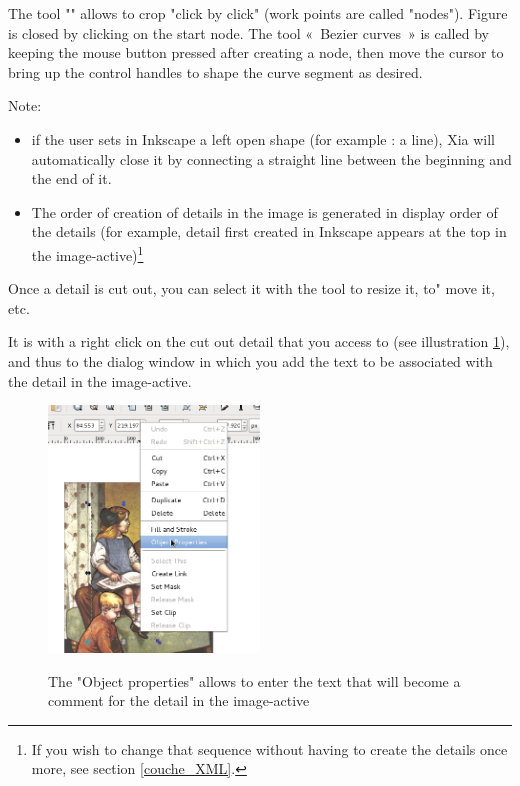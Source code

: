 The tool "" 
allows to crop "click by click" (work points are called 
"nodes").  Figure is closed by clicking on the start node. 
The tool «~Bezier curves~» is called by keeping the mouse button pressed 
after creating a node, then move the cursor to bring up the control handles 
to shape the curve segment as desired.

Note:
\begin{itemize}
 \item if the user sets in Inkscape a left open shape (for
example : a line), Xia will automatically close it  by connecting a 
 straight line between the beginning and the end of it.
 \item The order of creation of details in the image is generated in display 
order of the details (for example, detail first created in
Inkscape appears at the top in the image-active)\footnote{If you wish to 
change that sequence without having to create the details once more, see 
section 
\ref{couche_XML}.}
\end{itemize}

Once a detail is cut out, you can select it with the tool  
 to resize it, to" 
move it, etc.

It is with a right click on the cut out detail that you access to 
 (see illustration 
\ref{proprietes_objet}), and 
thus to the dialog window in which you add the text to be associated with the 
detail in the image-active.

\begin{figure}[htp]
 \centering
 \caption{The "Object properties" allows to enter the text that will become a 
 comment for the detail in the image-active}
 \includegraphics[width=0.5\textwidth]{./images/proprietes_objet}
 \label{proprietes_objet}
\end{figure}

